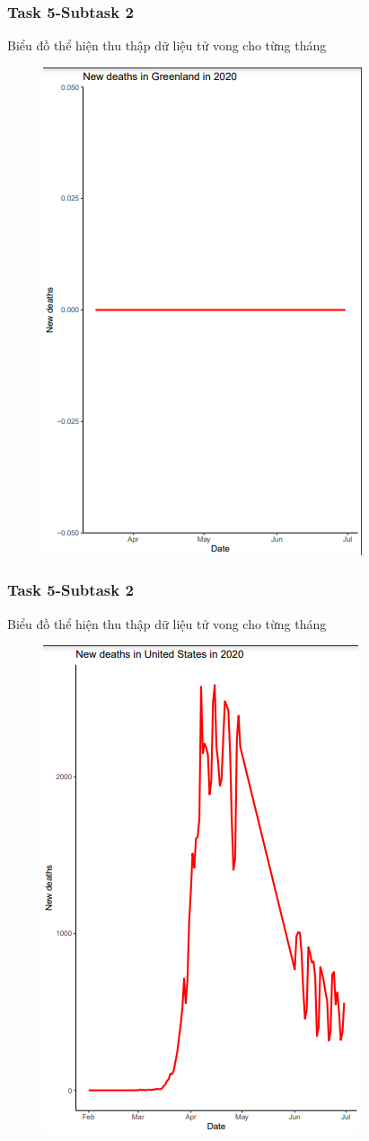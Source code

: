 \documentclass[english,10pt,table]{beamer}
\begin{document}
\frame
{
    \frametitle{Task 5-Subtask 2}
    \begin{block}{Biểu đồ thể hiện thu thập dữ liệu tử vong cho từng tháng}
    \begin{figure}[H]
		\centering
		\includegraphics[scale=0.5]{images/5.2.2.png}
	\end{figure}
    \end{block}
}
\frame
{
    \frametitle{Task 5-Subtask 2}
    \begin{block}{Biểu đồ thể hiện thu thập dữ liệu tử vong cho từng tháng}
    \begin{figure}[H]
		\centering
		\includegraphics[scale=0.5]{images/5.2.3.png}
	\end{figure}
    \end{block}
}
\end{document}
